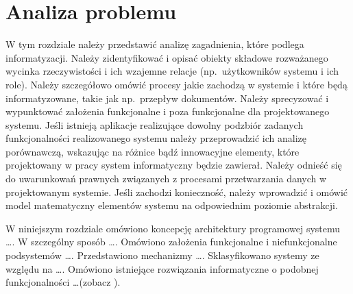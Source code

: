 \chapter{Analiza problemu}
\thispagestyle{chapterBeginStyle}
\label{rozdzial1}

W tym rozdziale należy przedstawić analizę zagadnienia, które podlega informatyzacji. Należy zidentyfikować i opisać obiekty składowe rozważanego wycinka rzeczywistości i ich wzajemne relacje (np.\ użytkowników systemu i ich role). Należy szczegółowo omówić procesy jakie zachodzą w systemie i które będą informatyzowane, takie jak np.\ przepływ dokumentów.
Należy sprecyzować i wypunktować założenia funkcjonalne i poza funkcjonalne dla projektowanego systemu.
Jeśli istnieją aplikacje realizujące dowolny podzbiór zadanych funkcjonalności realizowanego systemu należy przeprowadzić ich analizę porównawczą, wskazując na różnice bądź innowacyjne elementy, które projektowany w pracy system informatyczny będzie zawierał.
Należy odnieść się do uwarunkowań prawnych związanych z procesami przetwarzania danych w projektowanym systemie.
Jeśli zachodzi konieczność, należy wprowadzić i omówić model matematyczny elementów systemu na odpowiednim poziomie abstrakcji.

{\color{dgray}
W niniejszym rozdziale omówiono koncepcję architektury programowej systemu \ldots. W
szczególny sposób \ldots. Omówiono założenia funkcjonalne i niefunkcjonalne podsystemów \ldots. Przedstawiono
mechanizmy \ldots. Sklasyfikowano systemy ze względu na \ldots. Omówiono istniejące rozwiązania informatyczne o podobnej funkcjonalności \ldots (zobacz \cite{JCINodesChord}).
}


